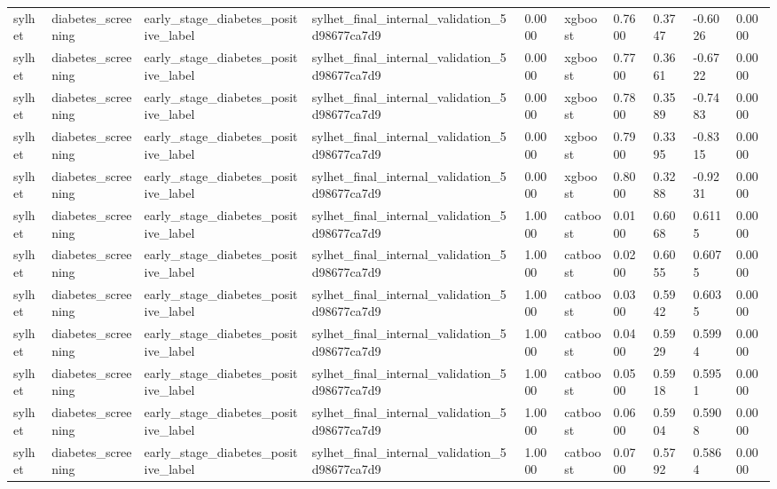 \begin{tabular}{llllllllll}
sylhet & diabetes\_screening & early\_stage\_diabetes\_positive\_label & sylhet\_final\_internal\_validation\_5d98677ca7d9 & 0.0000 & xgboost & 0.7600 & 0.3747 & -0.6026 & 0.0000 \\
sylhet & diabetes\_screening & early\_stage\_diabetes\_positive\_label & sylhet\_final\_internal\_validation\_5d98677ca7d9 & 0.0000 & xgboost & 0.7700 & 0.3661 & -0.6722 & 0.0000 \\
sylhet & diabetes\_screening & early\_stage\_diabetes\_positive\_label & sylhet\_final\_internal\_validation\_5d98677ca7d9 & 0.0000 & xgboost & 0.7800 & 0.3589 & -0.7483 & 0.0000 \\
sylhet & diabetes\_screening & early\_stage\_diabetes\_positive\_label & sylhet\_final\_internal\_validation\_5d98677ca7d9 & 0.0000 & xgboost & 0.7900 & 0.3395 & -0.8315 & 0.0000 \\
sylhet & diabetes\_screening & early\_stage\_diabetes\_positive\_label & sylhet\_final\_internal\_validation\_5d98677ca7d9 & 0.0000 & xgboost & 0.8000 & 0.3288 & -0.9231 & 0.0000 \\
sylhet & diabetes\_screening & early\_stage\_diabetes\_positive\_label & sylhet\_final\_internal\_validation\_5d98677ca7d9 & 1.0000 & catboost & 0.0100 & 0.6068 & 0.6115 & 0.0000 \\
sylhet & diabetes\_screening & early\_stage\_diabetes\_positive\_label & sylhet\_final\_internal\_validation\_5d98677ca7d9 & 1.0000 & catboost & 0.0200 & 0.6055 & 0.6075 & 0.0000 \\
sylhet & diabetes\_screening & early\_stage\_diabetes\_positive\_label & sylhet\_final\_internal\_validation\_5d98677ca7d9 & 1.0000 & catboost & 0.0300 & 0.5942 & 0.6035 & 0.0000 \\
sylhet & diabetes\_screening & early\_stage\_diabetes\_positive\_label & sylhet\_final\_internal\_validation\_5d98677ca7d9 & 1.0000 & catboost & 0.0400 & 0.5929 & 0.5994 & 0.0000 \\
sylhet & diabetes\_screening & early\_stage\_diabetes\_positive\_label & sylhet\_final\_internal\_validation\_5d98677ca7d9 & 1.0000 & catboost & 0.0500 & 0.5918 & 0.5951 & 0.0000 \\
sylhet & diabetes\_screening & early\_stage\_diabetes\_positive\_label & sylhet\_final\_internal\_validation\_5d98677ca7d9 & 1.0000 & catboost & 0.0600 & 0.5904 & 0.5908 & 0.0000 \\
sylhet & diabetes\_screening & early\_stage\_diabetes\_positive\_label & sylhet\_final\_internal\_validation\_5d98677ca7d9 & 1.0000 & catboost & 0.0700 & 0.5792 & 0.5864 & 0.0000 \\

\end{tabular}
